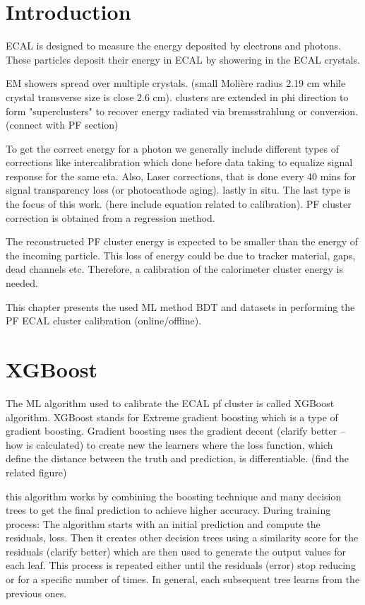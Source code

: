 
\section{Introduction}

ECAL is designed to measure the energy deposited by electrons and photons. These particles deposit their energy in ECAL by showering in the ECAL crystals.

EM showers spread over multiple crystals. (small Molière radius 2.19 cm while crystal transverse size is close 2.6 cm). clusters are extended in phi direction to form "superclusters" to recover energy radiated via bremsstrahlung or conversion. (connect with PF section)

To get the correct energy for a photon we generally include different types of corrections like intercalibration which done before data taking to equalize signal response for the same eta. Also, Laser corrections, that is done every 40 mins for signal transparency loss (or photocathode aging). lastly in situ. The last type is the focus of this work. (here include equation related to calibration). PF cluster correction is obtained from a regression method.

The reconstructed PF cluster energy is expected to be smaller than the energy of the incoming particle. This loss of energy could be due to tracker material, gaps, dead channels etc. Therefore, a calibration of the calorimeter cluster energy is needed.

This chapter presents the used ML method BDT and datasets in performing the PF ECAL cluster calibration (online/offline). 


\section{XGBoost} %

The ML algorithm used to calibrate the ECAL pf cluster is called XGBoost algorithm. XGBoost stands for Extreme gradient boosting which is a type of gradient boosting. Gradient boosting uses the gradient decent (clarify better – how is calculated) to create new the learners where the loss function, which define the distance between the truth and prediction, is differentiable.  (find the related figure)

this algorithm works by combining the boosting technique and many decision trees to get the final prediction to achieve higher accuracy. During training process: The algorithm starts with an initial prediction and compute the residuals, loss. Then it creates other decision trees using a similarity score for the residuals (clarify better) which are then used to generate the output values for each leaf.  This process is repeated either until the residuals (error) stop reducing or for a specific number of times. In general, each subsequent tree learns from the previous ones.

